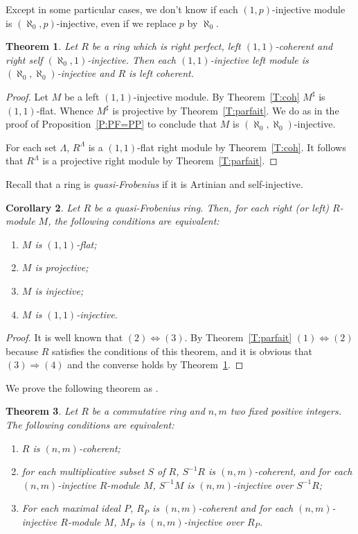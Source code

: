 \documentclass{amsart}
\newtheorem{theorem}{Theorem}[section]
\newtheorem{corollary}[theorem]{Corollary}
\begin{document}
\bigskip
Except in some particular cases, we don't know if each $(1,p)$-injective module is $(\aleph_0,p)$-injective, even if we replace $p$ by $\aleph_0$.
\begin{theorem}
\label{T:parfait2} Let $R$ be a ring which is right perfect, left $(1,1)$-coherent and right self $(\aleph_0,1)$-injective. Then each $(1,1)$-injective left module is $(\aleph_0,\aleph_0)$-injective and $R$ is left coherent.
\end{theorem}
\begin{proof}
Let $M$ be a left $(1,1)$-injective module. By Theorem~\ref{T:coh} $M^{\sharp}$ is $(1,1)$-flat. Whence $M^{\sharp}$ is projective by Theorem~\ref{T:parfait}. We do as in the proof of  Proposition~\ref{P:PF=PP} to conclude that $M$ is $(\aleph_0,\aleph_0)$-injective.

For each set $\Lambda$, $R^{\Lambda}$ is a $(1,1)$-flat right module by Theorem~\ref{T:coh}. It follows that $R^{\Lambda}$ is a projective right module by Theorem~\ref{T:parfait}.
\end{proof}

Recall that a ring is {\it quasi-Frobenius} if it is Artinian and self-injective.
\begin{corollary}
\label{C:Frob} Let $R$ be a quasi-Frobenius ring. Then, for each right (or left) $R$-module $M$, the following conditions are equivalent:
\begin{enumerate}
\item $M$ is $(1,1)$-flat;
\item $M$ is projective;
\item $M$ is injective;
\item $M$ is $(1,1)$-injective.
\end{enumerate}
\end{corollary}
\begin{proof}
It is well known that $(2)\Leftrightarrow (3)$. By Theorem~\ref{T:parfait} $(1)\Leftrightarrow (2)$ because $R$ satisfies the conditions of this theorem, and it is obvious that $(3)\Rightarrow (4)$ and the converse holds by Theorem~\ref{T:parfait2}.
\end{proof}


We prove the following theorem as \cite[Th\'eor\`eme 1.4]{Cou82}.

\begin{theorem}\label{T:locCoh}
\label{T:pure-projective} Let $R$ be a commutative ring and $n, m$ two fixed positive integers. The following conditions are equivalent:
\begin{enumerate}
\item $R$ is $(n,m)$-coherent;
\item for each multiplicative subset $S$ of $R$, $S^{-1}R$ is $(n,m)$-coherent, and for each $(n,m)$-injective $R$-module $M$, $S^{-1}M$ is $(n,m)$-injective over $S^{-1}R$;
\item For each maximal ideal $P$, $R_P$ is $(n,m)$-coherent and for each $(n,m)$-injective $R$-module $M$, $M_P$ is $(n,m)$-injective over $R_P$.
\end{enumerate} 
\end{theorem}
\end{document}
